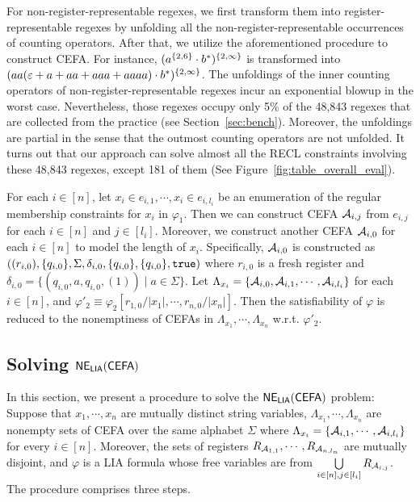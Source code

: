 For non-register-representable regexes, we first transform them into register-representable regexes by unfolding all the non-register-representable occurrences of counting operators. After that, we utilize the aforementioned procedure to construct CEFA. For instance, $(a^{\{2, 6\}} \cdot b^*)^{\{2,\infty\}}$ is transformed into $(aa(\varepsilon + a + aa + aaa+aaaa) \cdot b^*)^{\{2, \infty\}}$. 
The unfoldings of the inner counting operators of non-register-representable regexes incur an exponential blowup in the worst case. Nevertheless, those regexes occupy only 5\% of the 48,843 regexes that are collected from the practice (see Section~\ref{sec:bench}). Moreover, the unfoldings are partial in the sense that the outmost counting operators are not unfolded. 
It turns out that our approach can solve almost all the RECL constraints involving these 48,843 regexes, except 181 of them (See Figure~\ref{fig:table_overall_eval}). 

For each $i \in [n]$, let $x_i \in e_{i, 1}, \cdots, x_i \in e_{i, l_i}$ be an enumeration of the regular membership constraints for $x_i$ in $\varphi_1$.  Then we can construct CEFA $\mathcal{A}_{i, j}$ from $e_{i, j}$ for each $i \in [n]$ and $j \in [l_i]$. Moreover, we construct another CEFA $\mathcal{A}_{i, 0}$ for each $i \in [n]$ to model the length of $x_i$. Specifically, $\mathcal{A}_{i,0}$ is constructed as $((r_{i,0}), \{q_{i,0}\}, \Sigma, \delta_{i,0}, \{q_{i,0}\}, \{q_{i,0}\}, \mathtt{true})$ where $r_{i,0}$ is a fresh register and $\delta_{i,0} = \{(q_{i,0}, a, q_{i,0}, (1)) \mid a \in \Sigma\}$. 
Let $\Lambda_{x_i} = \{\mathcal{A}_{i,0}, \mathcal{A}_{i, 1}, \cdots, \mathcal{A}_{i, l_i}\}$ for each $i \in [n]$, and $\varphi'_2 \equiv \varphi_2[r_{1,0}/|x_1|, \cdots, r_{n,0}/|x_n|]$. Then the satisfiability of $\varphi$ is reduced to the nonemptiness of CEFAs in $\Lambda_{x_1}, \cdots, \Lambda_{x_n}$ w.r.t. $\varphi'_2$.


\subsection{Solving ${\sf NE_{LIA}(CEFA)}$} \label{subsec:cefadec}

In this section, we present a procedure to solve the ${\sf NE_{LIA}(CEFA)}$ problem: Suppose that $x_1, \cdots, x_n$ are mutually distinct string variables, $\Lambda_{x_1}, \cdots, \Lambda_{x_n}$ are nonempty sets of CEFA over the same alphabet $\Sigma$ where $\Lambda_{x_i} = \{\mathcal{A}_{i, 1}, \cdots, \mathcal{A}_{i, l_i}\}$ for every $i \in [n]$. Moreover, the sets of registers $R_{\mathcal{A}_{1, 1}}, \cdots, R_{\mathcal{A}_{n, l_n}}$ are mutually disjoint, and $\varphi$ is a LIA formula whose free variables are from $\bigcup \limits_{i \in [n], j \in [l_i]} R_{\mathcal{A}_{i, j}}$. 
The procedure comprises three steps. 

